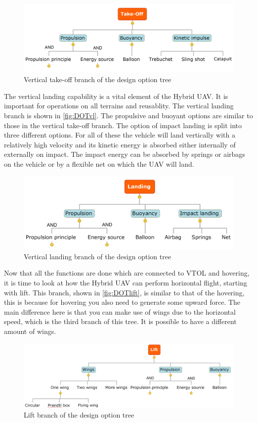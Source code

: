 \begin{figure}[H]
\centering
\includegraphics[width=.8\textwidth]{Concepts/Figures/Take-off}
\caption{Vertical take-off branch of the design option tree}
\label{fig:DOTvto}
\end{figure}

The vertical landing capability is a vital element of the Hybrid UAV. It is important for operations on all terrains and reusablity. The vertical landing branch is shown in \autoref{fig:DOTvl}. The propulsive and buoyant options are similar to those in the vertical take-off branch. The option of impact landing is split into three different options. For all of these the vehicle will land vertically with a relatively high velocity and its kinetic energy is absorbed either internally of externally on impact. The impact energy can be absorbed by springs or airbags on the vehicle or by a flexible net on which the UAV will land.

\begin{figure}[H]
\centering
\includegraphics[width=.7\textwidth]{Concepts/Figures/Landing}
\caption{Vertical landing branch of the design option tree}
\label{fig:DOTvl}
\end{figure}

Now that all the functions are done which are connected to VTOL and hovering, it is time to look at how the Hybrid UAV can perform horizontal flight, starting with lift. This branch, shown in \autoref{fig:DOTlift}, is similar to that of the hovering, this is because for hovering you also need to generate some upward force. The main difference here is that you can make use of wings due to the horizontal speed, which is the third branch of this tree. It is possible to have a different amount of wings.

\begin{figure}[H]
\centering
\includegraphics[width=1\textwidth]{Concepts/Figures/Lift}
\caption{Lift branch of the design option tree}
\label{fig:DOTlift}
\end{figure}

